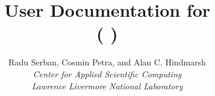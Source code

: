 \documentclass[twoside,openright,10pt]{report}
\title{User Documentation for {\idas} {\idasrelease} \\
           ({\sundials} {\sunrelease})}
\author{
  Radu Serban, Cosmin Petra, and Alan C. Hindmarsh\\
  {\em Center for Applied Scientific Computing} \\
  {\em Lawrence Livermore National Laboratory}
}
\date{
  \today 
  \vfill 
  {\centerline{\texttt{[image: doc\_logo\_blue]}}}
  \vfill \idaucrlug
}
\begin{document}
\frontug
\renewcommand{\chaptermark}[1]{\markboth{#1}{}}
\renewcommand{\sectionmark}[1]{\markright{\thesection\ #1}}


\clearemptydoublepage

\clearemptydoublepage

\clearemptydoublepage

\clearemptydoublepage

\clearemptydoublepage

\clearemptydoublepage

\clearemptydoublepage

\clearemptydoublepage

\clearemptydoublepage
\appendix

\clearemptydoublepage

\clearemptydoublepage


\clearemptydoublepage
\printindex
\clearemptydoublepage
\end{document}
